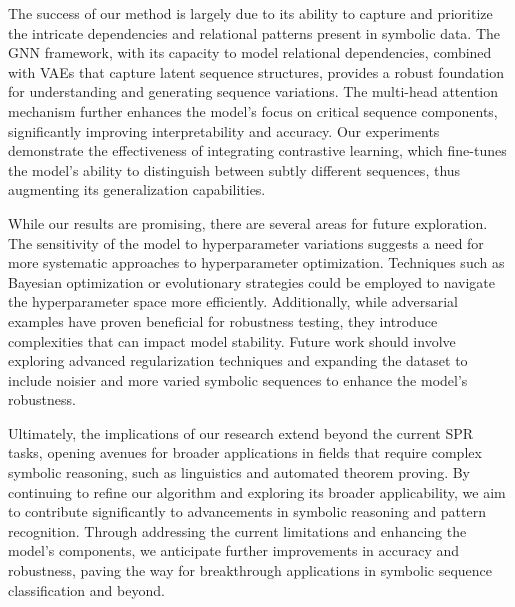 \documentclass{article}
\begin{document}
The success of our method is largely due to its ability to capture and prioritize the intricate dependencies and relational patterns present in symbolic data. The GNN framework, with its capacity to model relational dependencies, combined with VAEs that capture latent sequence structures, provides a robust foundation for understanding and generating sequence variations. The multi-head attention mechanism further enhances the model's focus on critical sequence components, significantly improving interpretability and accuracy. Our experiments demonstrate the effectiveness of integrating contrastive learning, which fine-tunes the model's ability to distinguish between subtly different sequences, thus augmenting its generalization capabilities.

While our results are promising, there are several areas for future exploration. The sensitivity of the model to hyperparameter variations suggests a need for more systematic approaches to hyperparameter optimization. Techniques such as Bayesian optimization or evolutionary strategies could be employed to navigate the hyperparameter space more efficiently. Additionally, while adversarial examples have proven beneficial for robustness testing, they introduce complexities that can impact model stability. Future work should involve exploring advanced regularization techniques and expanding the dataset to include noisier and more varied symbolic sequences to enhance the model's robustness.

Ultimately, the implications of our research extend beyond the current SPR tasks, opening avenues for broader applications in fields that require complex symbolic reasoning, such as linguistics and automated theorem proving. By continuing to refine our algorithm and exploring its broader applicability, we aim to contribute significantly to advancements in symbolic reasoning and pattern recognition. Through addressing the current limitations and enhancing the model's components, we anticipate further improvements in accuracy and robustness, paving the way for breakthrough applications in symbolic sequence classification and beyond.
\end{document}
